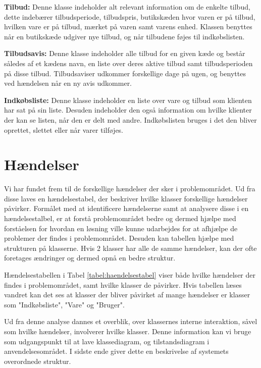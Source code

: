 \textbf{Tilbud:}
Denne klasse indeholder alt relevant information om de enkelte tilbud, dette indebærer tilbudsperiode, tilbudspris, butikskæden hvor varen er på tilbud, hvilken vare er på tilbud, mærket på varen samt varens enhed. Klassen benyttes når en butikskæde udgiver nye tilbud, og når tilbudene føjes til indkøbslisten.

\textbf{Tilbudsavis:}
Denne klasse indeholder alle tilbud for en given kæde og består således af et kædens navn, en liste over deres aktive tilbud samt tilbudsperioden på disse tilbud. Tilbudsaviser udkommer forskellige dage på ugen, og benyttes ved hændelsen når en ny avis udkommer.

\textbf{Indkøbsliste:}
Denne klasse indeholder en liste over vare og tilbud som klienten har sat på sin liste. Desuden indeholder den også information om hvilke klienter der kan se listen, når den er delt med andre. Indkøbslisten bruges i det den bliver oprettet, slettet eller når varer tilføjes.


\section{Hændelser}
Vi har fundet frem til de forskellige hændelser der sker i problemområdet. 
Ud fra disse laves en hændelsestabel, der beskriver hvilke klasser forskellige hændelser påvirker.
Formålet med at identificere hændelserne samt at analysere disse i en hændelsestalbel, er at forstå problemområdet bedre og dermed hjælpe med forståelsen for hvordan en løsning ville kunne udarbejdes for at afhjælpe de problemer der findes i problemområdet. Desuden kan tabellen hjælpe med strukturen på klasserne. 
Hvis 2 klasser har alle de samme hændelser, kan der ofte foretages ændringer og dermed opnå en bedre struktur.



Hændelsestabellen i Tabel \ref{tabel:haendelsestabel} viser både hvilke hændelser der findes i problemområdet, samt hvilke klasser de påvirker.
Hvis tabellen læses vandret kan det ses at klasser der bliver påvirket af mange hændelser er klasser som "Indkøbsliste", "Vare" og "Bruger".


Ud fra denne analyse dannes et overblik, over klassernes interne interaktion, såvel som hvilke hændelser, involverer hvilke klasser.
Denne information kan vi bruge som udgangspunkt til at lave klassediagram, og tilstandsdiagram i anvendelsesområdet.
I sidste ende giver dette en beskrivelse af systemets overordnede struktur.